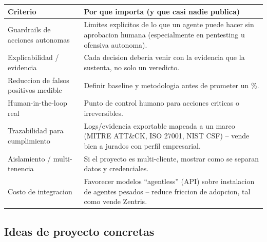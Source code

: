 \documentclass[11pt,a4paper]{article}
\begin{document}
\begin{longtable}{L{4.5cm}L{10.5cm}}
\toprule
\textbf{Criterio} & \textbf{Por que importa (y que casi nadie publica)} \\
\midrule
\endhead
Guardrails de acciones autonomas & Limites explicitos de lo que un agente puede hacer sin
aprobacion humana (especialmente en pentesting u ofensiva autonoma). \\
Explicabilidad / evidencia & Cada decision deberia venir con la evidencia que la sustenta, no
solo un veredicto. \\
Reduccion de falsos positivos medible & Definir baseline y metodologia antes de prometer un
\%. \\
Human-in-the-loop real & Punto de control humano para acciones criticas o irreversibles. \\
Trazabilidad para cumplimiento & Logs/evidencia exportable mapeada a un marco (MITRE ATT\&CK,
ISO 27001, NIST CSF) -- vende bien a jurados con perfil empresarial. \\
Aislamiento / multi-tenencia & Si el proyecto es multi-cliente, mostrar como se separan datos
y credenciales. \\
Costo de integracion & Favorecer modelos ``agentless'' (API) sobre instalacion de agentes
pesados -- reduce friccion de adopcion, tal como vende Zentris. \\
\bottomrule
\end{longtable}

\subsection{Ideas de proyecto concretas}
\end{document}
